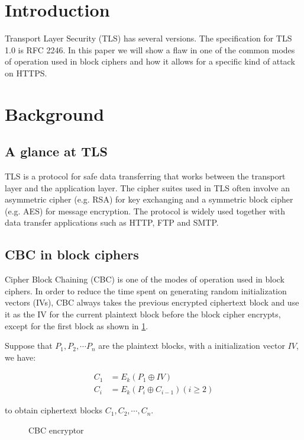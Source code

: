 \documentclass{acm_proc_article-sp}
\begin{document}
\section{Introduction}
Transport Layer Security (TLS) has several versions. The specification for TLS
1.0 is RFC 2246\cite{rfc2246}.
In this paper we will show a flaw in one of the common modes of operation used in block ciphers
and how it allows for a specific kind of attack\cite{beast} on HTTPS.

\section{Background}
\subsection{A glance at TLS}

TLS is a protocol for safe data transferring that works between the transport layer
and the application layer. The cipher suites used in TLS often involve an asymmetric cipher
(e.g. RSA) for key exchanging and a symmetric block cipher (e.g. AES) for message encryption.
The protocol is widely used together with data transfer applications such as HTTP, FTP and SMTP.

\subsection{CBC in block ciphers}
Cipher Block Chaining (CBC) is one of the modes of operation used in block ciphers.
In order to reduce the time spent on generating random initialization vectors (IVs), CBC always takes
the previous encrypted ciphertext block and use it as the IV for the current plaintext block before the
block cipher encrypts, except for the first block as shown in \ref{fig:cbc-encryptor}.

Suppose that $P_1,P_2,\cdots P_n$ are the plaintext blocks, with a initialization vector $IV$, we have:

$$
\begin{aligned}
C_1&=E_k(P_1\oplus IV)\\
C_i&=E_k(P_{i}\oplus C_{i-1}) (i\geq 2)
\end{aligned}
$$

to obtain ciphertext blocks $C_1,C_2,\cdots,C_n$.

\begin{figure}[htb]
  \centering
  
  \caption{CBC encryptor}
  \label{fig:cbc-encryptor}
\end{figure}
\end{document}
